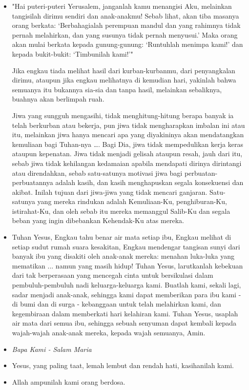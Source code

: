 \documentclass[a5paper,headsepline,titlepage,10pt,nnormalheadings,DIVcalc]{scrbook}
\newcommand{\BU}[1]{\begin{itemize} \item[U:] #1 \end{itemize}}
\newcommand{\BP}[1]{\begin{itemize} \item[P:] #1 \end{itemize}}
\newcommand{\kasihanilahKami}{\BP{Yesus, yang paling taat, lemah lembut dan rendah hati, kasihanilah kami.}
\BU{Allah ampunilah kami orang berdosa.}}
\begin{document}
\BP{"Hai puteri-puteri Yerusalem, janganlah kamu menangisi Aku, melainkan tangisilah dirimu sendiri dan anak-anakmu! Sebab lihat, akan tiba masanya orang berkata: `Berbahagialah perempuan mandul dan yang rahimnya tidak pernah melahirkan, dan yang susunya tidak pernah menyusui.' Maka orang akan mulai berkata kepada gunung-gunung: `Runtuhlah menimpa kami!' dan kepada bukit-bukit: `Timbunilah kami!'"

Jika engkau tiada melihat hasil dari kurban-kurbanmu, dari penyangkalan dirimu, ataupun jika engkau melihatnya di kemudian hari, yakinlah bahwa semuanya itu bukannya sia-sia dan tanpa hasil, melainkan sebaliknya, buahnya akan berlimpah ruah.

Jiwa yang sungguh mengasihi, tidak menghitung-hitung berapa banyak ia telah berkurban atau bekerja, pun jiwa tidak mengharapkan imbalan ini atau itu, melainkan jiwa hanya mencari apa yang diyakininya akan mendatangkan kemuliaan bagi Tuhan-nya \dots . Bagi Dia, jiwa tidak mempedulikan kerja keras ataupun kepenatan. Jiwa tidak menjadi gelisah ataupun resah, jauh dari itu, sebab jiwa tidak kehilangan kedamaian apabila mendapati dirinya dirintangi atau direndahkan, sebab satu-satunya motivasi jiwa bagi perbuatan-perbuatannya adalah kasih, dan kasih menghapuskan segala konsekuensi dan akibat. Inilah tujuan dari jiwa-jiwa yang tidak mencari ganjaran. Satu-satunya yang mereka rindukan adalah Kemuliaan-Ku, penghiburan-Ku, istirahat-Ku, dan oleh sebab itu mereka memanggul Salib-Ku dan segala beban yang ingin dibebankan Kehendak-Ku atas mereka. }

\BU{Tuhan Yesus, Engkau tahu benar air mata setiap ibu, Engkau melihat di setiap sudut rumah suara kesakitan, Engkau mendengar tangisan sunyi dari banyak ibu yang disakiti oleh anak-anak mereka: menahan luka-luka yang mematikan ... namun yang masih hidup! Tuhan Yesus, larutkanlah kebekuan dari tak berperasaan yang mencegah cinta untuk bersikulasi dalam pembuluh-pembuluh nadi keluarga-keluarga kami. Buatlah kami, sekali lagi, sadar menjadi anak-anak, sehingga kami dapat memberikan para ibu kami - di bumi dan di surga - kebanggaan untuk telah melahirkan kami, dan kegembiraan dalam memberkati hari kelahiran kami. Tuhan Yesus, usaplah air mata dari semua ibu, sehingga sebuah senyuman dapat kembali kepada wajah-wajah anak-anak mereka, kepada wajah semuanya, Amin.}

\large\begin{itemize}\item[~]\it{Bapa Kami - Salam Maria}\end{itemize}\normalsize
\kasihanilahKami
\end{document}

